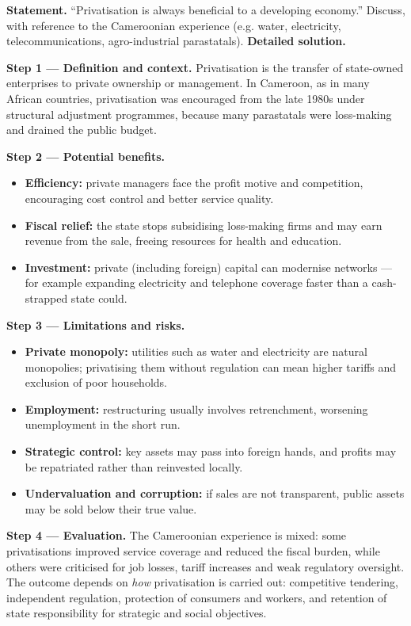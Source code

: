 \documentclass[11pt]{article}
\begin{document}
\begin{exoresolu}
\textbf{Statement.} ``Privatisation is always beneficial to a developing economy.'' Discuss, with reference to the Cameroonian experience (e.g. water, electricity, telecommunications, agro-industrial parastatals).
\tcblower
\textbf{Detailed solution.}

\textbf{Step 1 — Definition and context.} Privatisation is the transfer of state-owned enterprises to private ownership or management. In Cameroon, as in many African countries, privatisation was encouraged from the late 1980s under structural adjustment programmes, because many parastatals were loss-making and drained the public budget.

\textbf{Step 2 — Potential benefits.}
\begin{itemize}
\item \textbf{Efficiency:} private managers face the profit motive and competition, encouraging cost control and better service quality.
\item \textbf{Fiscal relief:} the state stops subsidising loss-making firms and may earn revenue from the sale, freeing resources for health and education.
\item \textbf{Investment:} private (including foreign) capital can modernise networks — for example expanding electricity and telephone coverage faster than a cash-strapped state could.
\end{itemize}

\textbf{Step 3 — Limitations and risks.}
\begin{itemize}
\item \textbf{Private monopoly:} utilities such as water and electricity are natural monopolies; privatising them without regulation can mean higher tariffs and exclusion of poor households.
\item \textbf{Employment:} restructuring usually involves retrenchment, worsening unemployment in the short run.
\item \textbf{Strategic control:} key assets may pass into foreign hands, and profits may be repatriated rather than reinvested locally.
\item \textbf{Undervaluation and corruption:} if sales are not transparent, public assets may be sold below their true value.
\end{itemize}

\textbf{Step 4 — Evaluation.} The Cameroonian experience is mixed: some privatisations improved service coverage and reduced the fiscal burden, while others were criticised for job losses, tariff increases and weak regulatory oversight. The outcome depends on \emph{how} privatisation is carried out: competitive tendering, independent regulation, protection of consumers and workers, and retention of state responsibility for strategic and social objectives.


\end{exoresolu}
\end{document}
